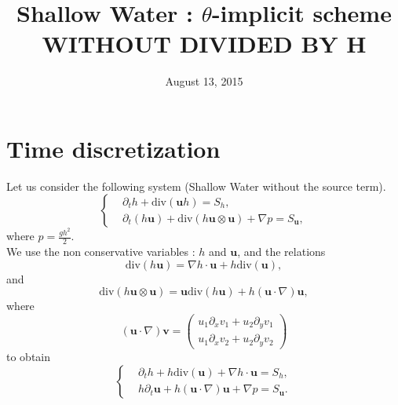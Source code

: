 \documentclass[a4paper, 11pt]{article}
\begin{document}
\title{Shallow Water : $\theta$-implicit scheme \\ WITHOUT DIVIDED BY H}
\date{August 13, 2015}
\author{}
\maketitle
\section{Time discretization}
Let us consider the following system (Shallow Water without the source term).
\begin{equation*}
\left\{
\begin{split}
&\partial_t h+\text{div}\left(\boldsymbol{u}h\right)=S_h,\\
&\partial_t \left(h\boldsymbol{u}\right)+\text{div}\left(h\boldsymbol{u}\otimes \boldsymbol{u}\right)+\nabla p=S_{\boldsymbol{u}},
\end{split}
\right.
\end{equation*}
where $p=\frac{gh^2}{2}.$\\
We use the non conservative variables : $h$ and $\boldsymbol{u}$, and the relations
\begin{equation*}
\text{div}\left(h\boldsymbol{u}\right)=\nabla h\cdot\boldsymbol{u}+h\text{div}\left(\boldsymbol{u}\right),
\end{equation*}
and
\begin{equation*}
\text{div}\left(h\boldsymbol{u}\otimes\boldsymbol{u}\right)=\boldsymbol{u}\text{div}\left(h\boldsymbol{u}\right)+h\left(\boldsymbol{u}\cdot\nabla\right)\boldsymbol{u},
\end{equation*}
where
\begin{equation*}
\left(\boldsymbol{u}\cdot\nabla\right)\boldsymbol{v}=\begin{pmatrix}u_1\partial_xv_1+u_2\partial_yv_1\\u_1\partial_xv_2+u_2\partial_yv_2\end{pmatrix}
\end{equation*}
to obtain 
\begin{equation*}
\left\{\begin{split}
&\partial_t h+h\text{div}(\boldsymbol{u})+\nabla h\cdot \boldsymbol{u}=S_h,\\
&h\partial_t \boldsymbol{u}+h\left(\boldsymbol{u}\cdot \nabla\right)\boldsymbol{u}+\nabla p=S_{\boldsymbol{u}}.
\end{split}\right.
\end{equation*}
\end{document}
